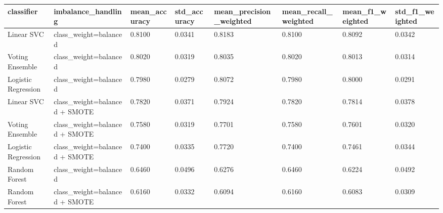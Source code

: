 \begin{tabular}{llllllll}
\toprule
classifier & imbalance\_handling & mean\_accuracy & std\_accuracy & mean\_precision\_weighted & mean\_recall\_weighted & mean\_f1\_weighted & std\_f1\_weighted \\
\midrule
Linear SVC & class\_weight=balanced & 0.8100 & 0.0341 & 0.8183 & 0.8100 & 0.8092 & 0.0342 \\
Voting Ensemble & class\_weight=balanced & 0.8020 & 0.0319 & 0.8035 & 0.8020 & 0.8013 & 0.0314 \\
Logistic Regression & class\_weight=balanced & 0.7980 & 0.0279 & 0.8072 & 0.7980 & 0.8000 & 0.0291 \\
Linear SVC & class\_weight=balanced + SMOTE & 0.7820 & 0.0371 & 0.7924 & 0.7820 & 0.7814 & 0.0378 \\
Voting Ensemble & class\_weight=balanced + SMOTE & 0.7580 & 0.0319 & 0.7701 & 0.7580 & 0.7601 & 0.0320 \\
Logistic Regression & class\_weight=balanced + SMOTE & 0.7400 & 0.0335 & 0.7720 & 0.7400 & 0.7461 & 0.0344 \\
Random Forest & class\_weight=balanced & 0.6460 & 0.0496 & 0.6276 & 0.6460 & 0.6224 & 0.0492 \\
Random Forest & class\_weight=balanced + SMOTE & 0.6160 & 0.0332 & 0.6094 & 0.6160 & 0.6083 & 0.0309 \\
\bottomrule
\end{tabular}
